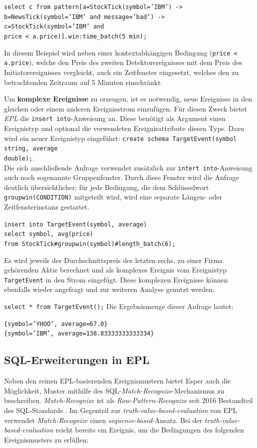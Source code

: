 \documentclass{acm_proc_article-sp}
\begin{document}
\texttt{select c from pattern[a=StockTick(symbol='IBM') ->\\
    b=NewsTick(symbol='IBM' and message='bad') ->\\
    c=StockTick(symbol='IBM' and\\ price < a.price)].win:time\_batch(5 min);}

In diesem Beispiel wird neben einer kontextabhängigen Bedingung (\texttt{price < 
a.price}), welche den Preis des zweiten Detektorereignisses mit dem Preis des 
Initiatorereignisses vergleicht, auch ein Zeitfenster eingesetzt, welches den zu 
betrachtenden Zeitraum auf 5 Minuten einschränkt.

Um \textbf{komplexe Ereignisse} zu erzeugen, ist es notwendig, neue Ereignisse in den 
gleichen oder einem anderen Ereignisstrom einzufügen. Für diesen Zweck bietet 
\textit{EPL} die 
\texttt{insert into}-Anweisung an. Diese benötigt als Argument einen Ereignistyp und 
optional die verwendeten Ereignisattribute diesen Typs. Dazu wird ein neuer Ereignistyp 
eingeführt: \texttt{create schema TargetEvent(symbol string, average\\ double);}.\\
Die sich anschließende Anfrage verwendet zusätzlich zur \texttt{intert into}-Anweisung 
auch noch sogenannte Gruppenfenster. Durch diese Fenster wird die Anfrage deutlich 
übersichtlicher; für jede Bedingung, die dem Schlüsselwort \texttt{groupwin(CONDITION)} 
mitgeteilt wird, wird eine separate Längen- oder Zeitfensterinstanz gestartet.

\texttt{insert into TargetEvent(symbol, average)\\
select symbol, avg(price)\\
from StockTick\#groupwin(symbol)\#length\_batch(6);}

Es wird jeweils der Durchschnittspreis der letzten sechs, zu einer Firma gehörenden 
Aktie berechnet und als komplexes Ereignis vom Ereignistyp \texttt{TargetEvent} in den 
Strom eingefügt. Diese komplexen Ereignisse können ebenfalls wieder angefragt und 
zur weiteren Analyse genutzt werden.


\texttt{select  * from TargetEvent();} 
\newpage
Die Ergebnismenge dieser Anfrage lautet:

\texttt{\{symbol='YHOO', average=67.0\}}\\
\texttt{\{symbol='IBM', average=138.83333333333334\}}

\subsection{SQL-Erweiterungen in EPL}\label{sql}
\vspace{0.1cm}
Neben den reinen EPL-basierenden Ereignismustern bietet Esper auch die Möglichkeit, 
Muster mithilfe des SQL-\emph{Match-Recognize}-Mechanismus zu beschreiben. 
\emph{Match-Recognize} ist als \emph{Row-Pattern-Recognize} seit 2016 Bestandteil des 
SQL-Standards 
\cite{sql-2016}. Im Gegenteil zur \emph{truth-value-based-evaluation} von EPL verwendet 
\emph{Match-Recognize} einen \emph{sequence-based}-Ansatz. Bei der 
\emph{truth-value-based-evaluation} reicht bereits ein Ereignis, um die Bedingungen des 
folgenden Ereignismusters zu erfüllen:
\end{document}
